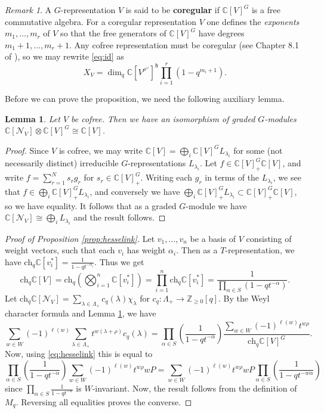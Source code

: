 \documentclass[12pt]{article}
\newcommand{\Z}{\mathbb{Z}}
\newcommand{\C}{\mathbb{C}}
\newtheorem{lemma}[theorem]{Lemma}
\theoremstyle{definition}
\theoremstyle{remark}
\newtheorem{remark}[theorem]{Remark}
\newcommand{\ch}{\mathrm{ch}}
\newcommand{\N}{\mathcal{N}}
\newcommand{\h}{\mathfrak{h}}
\begin{document}
\begin{remark}
    A $G$-representation $V$ is said to be \textbf{coregular} if $\C[V]^G$ is a free commutative algebra. For a coregular representation $V$ one defines the \emph{exponents} $m_1,\dots,m_r$ of $V$ so that the free generators of $\C[V]^G$ have degrees $m_1+1,\dots,m_r+1$. Any cofree representation must be coregular (see Chapter 8.1 of \cite{book}), so we may rewrite \eqref{eq:id} as
    \[X_V=\dim_q\C[V^{\rho^\vee}]^\h\prod_{i=1}^r(1-q^{m_i+1}).\]
\end{remark}

Before we can prove the proposition, we need the following auxiliary lemma. 

\begin{lemma}\label{lem:cofreeiso}
    Let $V$ be cofree. Then we have an isomorphism of graded $G$-modules $\C[\N_V]\otimes\C[V]^G\cong\C[V]$.
\end{lemma}

\begin{proof}
    Since $V$ is cofree, we may write $\C[V]=\bigoplus_i\C[V]^GL_{\lambda_i}$ for some (not necessarily distinct) irreducible $G$-representations $L_{\lambda_i}$. Let $f\in\C[V]_+^G\C[V]$, and write $f=\sum_{r=1}^Ns_rg_r$ for $s_r\in\C[V]^G_+$. Writing each $g_r$ in terms of the $L_{\lambda_i}$, we see that $f\in\bigoplus_i\C[V]^G_+L_{\lambda_i}$, and conversely we have $\bigoplus_i\C[V]^G_+L_{\lambda_i}\subset\C[V]^G_+\C[V]$, so we have equality. It follows that as a graded $G$-module we have $\C[\N_V]\cong\bigoplus_iL_{\lambda_i}$ and the result follows.
\end{proof}

\begin{proof}[Proof of Proposition \ref{prop:hesselink}]
    Let $v_1,\dots,v_n$ be a basis of $V$ consisting of weight vectors, such that each $v_i$ has weight $\alpha_i$. Then as a $T$-representation, we have $\ch_q\C[v_i^*]=\frac{1}{1-qt^{-\alpha_i}}$. Thus we get
    \[\ch_q\C[V]=\ch_q\left(\bigotimes_{i=1}^n\C[v_i^*]\right)=\prod_{i=1}^n\ch_q\C[v_i^*]=\frac{1}{\prod_{\alpha\in S}(1-qt^{-\alpha})}.\]
    Let $\ch_q\C[\N_V]=\sum_{\lambda\in\Lambda_+}c_q(\lambda)\chi_\lambda$ for $c_q:\Lambda_+\to\Z_{\geq 0}[q]$. By the Weyl character formula and Lemma \ref{lem:cofreeiso}, we have
    \[\sum_{w\in W}(-1)^{\ell(w)}\sum_{\lambda\in\Lambda_+}t^{w(\lambda+\rho)}c_q(\lambda)=\prod_{\alpha\in S}\left(\frac{1}{1-qt^{-\alpha}}\right)\frac{\sum_{w\in W}(-1)^{\ell(w)}t^{w\rho}}{\ch_q\C[V]^G}.\]
    Now, using \eqref{eq:hesselink} this is equal to
    \[\prod_{\alpha\in S}\left(\frac{1}{1-qt^{-\alpha}}\right)\sum_{w\in W}(-1)^{\ell(w)}t^{w\rho}wP=\sum_{w\in W}(-1)^{\ell(w)}t^{w\rho}wP\prod_{\alpha\in S}\left(\frac{1}{1-qt^{-w\alpha}}\right)\]
    since $\prod_{\alpha\in S}\frac{1}{1-qt^{-\alpha}}$ is $W$-invariant. Now, the result follows from the definition of $M_q$. Reversing all equalities proves the converse.
\end{proof}
\end{document}
